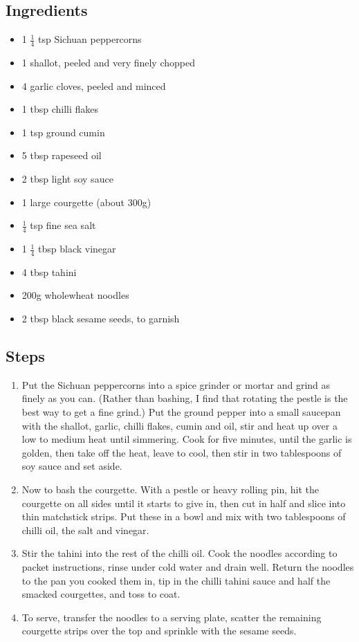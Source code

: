 \documentclass{book}
\begin{document}
\subsection*{Ingredients}
\begin{itemize}
\item 1 $\frac{1}{4}$ tsp Sichuan peppercorns
\item 1 shallot, peeled and very finely chopped
\item 4 garlic cloves, peeled and minced
\item 1 tbsp chilli flakes
\item 1 tsp ground cumin
\item 5 tbsp rapeseed oil
\item 2 tbsp light soy sauce 
\item 1 large courgette (about 300g)
\item $\frac{1}{4}$ tsp fine sea salt
\item 1 $\frac{1}{4}$ tbsp black vinegar
\item 4 tbsp tahini
\item 200g wholewheat noodles
\item 2 tbsp black sesame seeds, to garnish
\end{itemize}

\subsection*{Steps}
\begin{enumerate}
\item Put the Sichuan peppercorns into a spice grinder or mortar and grind as finely as you can. (Rather than bashing, I find that rotating the pestle is the best way to get a fine grind.) Put the ground pepper into a small saucepan with the shallot, garlic, chilli flakes, cumin and oil, stir and heat up over a low to medium heat until simmering. Cook for five minutes, until the garlic is golden, then take off the heat, leave to cool, then stir in two tablespoons of soy sauce and set aside.
\item Now to bash the courgette. With a pestle or heavy rolling pin, hit the courgette on all sides until it starts to give in, then cut in half and slice into thin matchstick strips. Put these in a bowl and mix with two tablespoons of chilli oil, the salt and vinegar.
\item Stir the tahini into the rest of the chilli oil. Cook the noodles according to packet instructions, rinse under cold water and drain well. Return the noodles to the pan you cooked them in, tip in the chilli tahini sauce and half the smacked courgettes, and toss to coat.
\item To serve, transfer the noodles to a serving plate, scatter the remaining courgette strips over the top and sprinkle with the sesame seeds.
\end{enumerate}
\newpage
\end{document}

